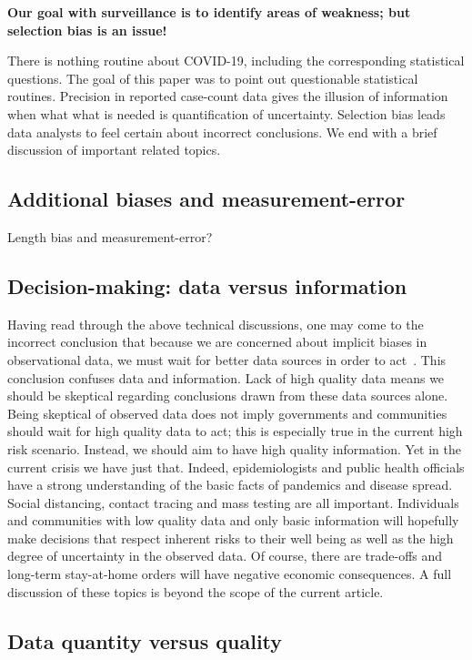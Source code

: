 \documentclass[11pt]{amsart}
\begin{document}
{\bf Our goal with surveillance is to identify areas of weakness; but selection bias is an issue!}

There is nothing routine about COVID-19, including the corresponding statistical questions.  The goal of this paper was to point out questionable statistical routines.  Precision in reported case-count data gives the illusion of information when what what is needed is quantification of uncertainty. Selection bias leads data analysts to feel certain about incorrect conclusions.  We end with a brief discussion of important related topics.

\subsection*{Additional biases and measurement-error}

Length bias and measurement-error?

\subsection*{Decision-making: data versus information}

Having read through the above technical discussions, one may come to the incorrect conclusion that because we are concerned about implicit biases in observational data, we must wait for better data sources in order to act~\citep{Ioannidis2020}.  This conclusion confuses data and information.  Lack of high quality data means we should be skeptical regarding conclusions drawn from these data sources alone.  Being skeptical of observed data does not imply governments and communities should wait for high quality data to act; this is especially true in the current high risk scenario.  Instead, we should aim to have high quality information.  Yet in the current crisis we have just that.  Indeed, epidemiologists and public health officials have a strong understanding of the basic facts of pandemics and disease spread.  Social distancing, contact tracing and mass testing are all important.  Individuals and communities with low quality data and only basic information will hopefully make decisions that respect inherent risks to their well being as well as the high degree of uncertainty in the observed data. Of course, there are trade-offs and long-term stay-at-home orders will have negative economic consequences.  A full discussion of these topics is beyond the scope of the current article.

\subsection*{Data quantity versus quality}
\end{document}
